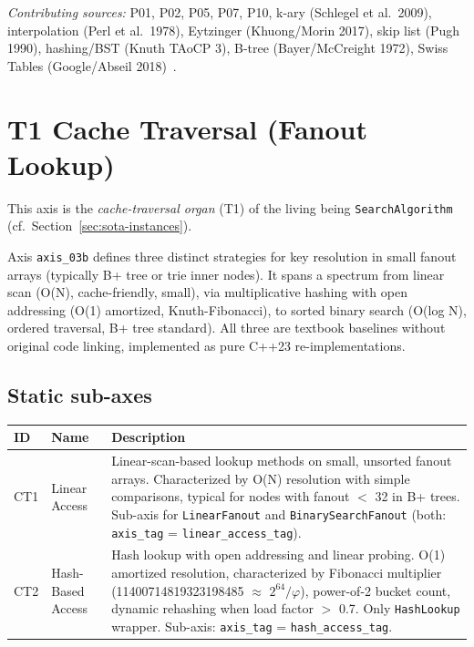 \emph{Contributing sources:} P01, P02, P05, P07, P10, k-ary (Schlegel et al.\ 2009), interpolation (Perl et al.\ 1978), Eytzinger (Khuong/\allowbreak{}Morin 2017), skip list (Pugh 1990), hashing/\allowbreak{}BST (Knuth TAo\allowbreak{}CP 3), B-tree (Bayer/\allowbreak{}Mc\allowbreak{}Creight 1972), Swiss Tables (Google/\allowbreak{}Abseil 2018)~\cite{leis2013art,binna2018hot,fent2020start,wu2019wormhole,zhang2018surf,schlegel2009kary,perl1978interpolation,khuong2017eytzinger,pugh1990skiplist,knuth1998taocp3,bayer1972btree,abseil_swisstable}.

\section{T1 Cache Traversal (Fanout Lookup)}

This axis is the \emph{cache-traversal organ} (T1) of the living being \texttt{SearchAlgorithm} (cf.\ Section~\ref{sec:sota-instances}).

Axis \texttt{axis\_\allowbreak{}03b} defines three distinct strategies for key resolution in small fanout arrays (typically B+ tree or trie inner nodes). It spans a spectrum from linear scan (O(N), cache-friendly, small), via multiplicative hashing with open addressing (O(1) amortized, Knuth-Fibonacci), to sorted binary search (O(log N), ordered traversal, B+ tree standard). All three are textbook baselines without original code linking, implemented as pure C++23 re-implementations.

\subsection*{Static sub-axes}
\begin{scriptsize}
\begin{longtable}{@{}>{\raggedright\arraybackslash}p{1.8cm} >{\raggedright\arraybackslash}p{3.2cm} >{\raggedright\arraybackslash}p{8.5cm}@{}}
\toprule
ID & Name & Description \\
\midrule
\endhead%
CT1 & Linear Access & Linear-scan-based lookup methods on small, unsorted fanout arrays. Characterized by O(N) resolution with simple comparisons, typical for nodes with fanout $<$ 32 in B+ trees. Sub-axis for \texttt{Linear\allowbreak{}Fanout} and \texttt{Binary\allowbreak{}Search\allowbreak{}Fanout} (both: \texttt{axis\_\allowbreak{}tag} = \texttt{linear\_\allowbreak{}access\_\allowbreak{}tag}). \\
CT2 & Hash-Based Access & Hash lookup with open addressing and linear probing. O(1) amortized resolution, characterized by Fibonacci multiplier (11400714819323198485 $\approx$ $2^{64}/\allowbreak{}\varphi$), power-of-2 bucket count, dynamic rehashing when load factor $>$ 0.7. Only \texttt{Hash\allowbreak{}Lookup} wrapper. Sub-axis: \texttt{axis\_\allowbreak{}tag} = \texttt{hash\_\allowbreak{}access\_\allowbreak{}tag}. \\
\bottomrule
\end{longtable}
\end{scriptsize}

